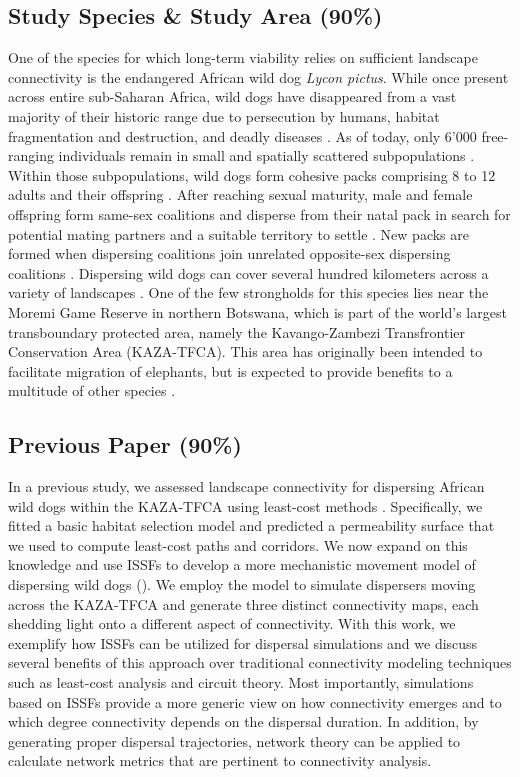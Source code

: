 \documentclass[abstract=on,10pt,a4paper,bibliography=totocnumbered]{article}
\begin{document}
\subsection{Study Species \& Study Area (90\%)}
One of the species for which long-term viability relies on sufficient landscape
connectivity is the endangered African wild dog \textit{Lycon pictus}. While
once present across entire sub-Saharan Africa, wild dogs have disappeared from a
vast majority of their historic range due to persecution by humans, habitat
fragmentation and destruction, and deadly diseases \citep{Woodroffe.2012}. As of
today, only 6'000 free-ranging individuals remain in small and spatially
scattered subpopulations \citep{Woodroffe.2012}. Within those subpopulations,
wild dogs form cohesive packs comprising 8 to 12 adults and their offspring
\cite{McNutt.1995}. After reaching sexual maturity, male and female offspring
form same-sex coalitions and disperse from their natal pack in search for
potential mating partners and a suitable territory to settle \citep{McNutt.1996,
Behr.2020}. New packs are formed when dispersing coalitions join unrelated
opposite-sex dispersing coalitions \citep{McNutt.1996}. Dispersing wild dogs can
cover several hundred kilometers across a variety of landscapes
\citep{DaviesMostert.2012, Masenga.2016, Cozzi.2020, Hofmann.2021}. One of the
few strongholds for this species lies near the Moremi Game Reserve in northern
Botswana, which is part of the world's largest transboundary protected area,
namely the Kavango-Zambezi Transfrontier Conservation Area (KAZA-TFCA). This
area has originally been intended to facilitate migration of elephants, but is
expected to provide benefits to a multitude of other species \citep{Elliot.2014,
Brennan.2020, Hofmann.2021}.

\subsection{Previous Paper (90\%)}
In a previous study, we assessed landscape connectivity for dispersing African
wild dogs within the KAZA-TFCA using least-cost methods \citep{Hofmann.2021}.
Specifically, we fitted a basic habitat selection model and predicted a
permeability surface that we used to compute least-cost paths and corridors. We
now expand on this knowledge and use ISSFs to develop a more mechanistic
movement model of dispersing wild dogs (). We employ the
model to simulate dispersers moving across the KAZA-TFCA and generate three
distinct connectivity maps, each shedding light onto a different aspect of
connectivity. With this work, we exemplify how ISSFs can be utilized for
dispersal simulations and we discuss several benefits of this approach over
traditional connectivity modeling techniques such as least-cost analysis and
circuit theory. Most importantly, simulations based on ISSFs provide a more
generic view on how connectivity emerges and to which degree connectivity
depends on the dispersal duration. In addition, by generating proper dispersal
trajectories, network theory can be applied to calculate network metrics that
are pertinent to connectivity analysis.
\end{document}
